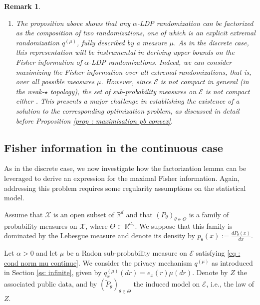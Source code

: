 \documentclass[a4paper, 11pt]{article}
\newtheorem{rem}{Remark}
\theoremstyle{definition}
\newcommand{\R}{{\mathbb{R}}}
\newcommand{\cE}{{\mathcal{E}}}
\newcommand{\cX}{{\mathcal{X}}}
\begin{document}
{\begin{rem}
\begin{enumerate}
    \item The proposition above shows that any $\alpha$-LDP randomization can be factorized as the composition of two randomizations, one of which is an explicit extremal randomization $q^{(\mu)}$, fully described by a measure $\mu$. As in the discrete case, this representation will be instrumental in deriving upper bounds on the Fisher information of $\alpha$-LDP randomizations. Indeed, we can consider maximizing the Fisher information over all extremal randomizations, that is, over all possible measures $\mu$. However, since $\cE$ is not compact in general (in the weak-$\star$ topology), the set of sub-probability measures on $\cE$ is not compact either . This presents a major challenge in establishing the existence of a solution to the corresponding optimization problem, as discussed in detail before Proposition \ref{prop : maximisation pb convex}.
\end{enumerate}
\end{rem}


\subsection{Fisher information in the continuous case}{\label{Ss : Fisher cont}}
As in the discrete case, we now investigate how the factorization lemma can be leveraged to derive an expression for the maximal Fisher information. Again, addressing this problem requires some regularity assumptions on the statistical model.

Assume that $\cX$ is an open subset of $\R^d$ and that $(P_{\theta})_{\theta \in \Theta}$ is a family of probability measures on $\cX$, where $\Theta \subset \R^{d_\Theta}$. We suppose that this family is dominated by the Lebesgue measure and denote its density by $p_{\theta}(x) := \frac{dP_\theta(x)}{dx}$.

Let $\alpha > 0$ and let $\mu$ be a Radon sub-probability measure on $\cE$ satisfying \eqref{eq : cond norm mu continue}. We consider the privacy mechanism $q^{(\mu)}$ as introduced in Section \ref{ss: infinite}, given by $q^{(\mu)}_x(dr) = e_x(r)\mu(dr)$. Denote by $Z$ the associated public data, and by $(\widetilde{P}_{\theta})_{\theta \in \Theta}$ the induced model on $\cE$, i.e., the law of $Z$.

}
\end{document}
